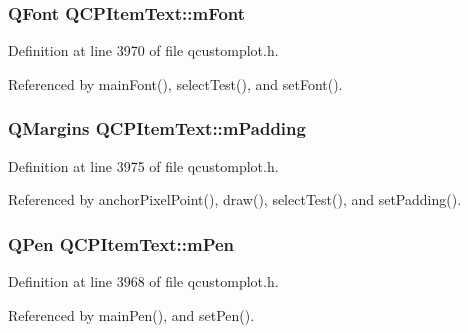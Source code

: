 \subsubsection[{m\+Font}]{\setlength{\rightskip}{0pt plus 5cm}Q\+Font Q\+C\+P\+Item\+Text\+::m\+Font\hspace{0.3cm}{\ttfamily [protected]}}\label{class_q_c_p_item_text_a1dc87fe2a824820d549ffd7e644eef8d}


Definition at line 3970 of file qcustomplot.\+h.



Referenced by main\+Font(), select\+Test(), and set\+Font().

\hypertarget{class_q_c_p_item_text_ae7b3ef0ce6046efd4b346d28f2e1fb67}{}
\subsubsection[{m\+Padding}]{\setlength{\rightskip}{0pt plus 5cm}Q\+Margins Q\+C\+P\+Item\+Text\+::m\+Padding\hspace{0.3cm}{\ttfamily [protected]}}\label{class_q_c_p_item_text_ae7b3ef0ce6046efd4b346d28f2e1fb67}


Definition at line 3975 of file qcustomplot.\+h.



Referenced by anchor\+Pixel\+Point(), draw(), select\+Test(), and set\+Padding().

\hypertarget{class_q_c_p_item_text_aa02388705dbbff1bf7b8aa872b5f579c}{}
\subsubsection[{m\+Pen}]{\setlength{\rightskip}{0pt plus 5cm}Q\+Pen Q\+C\+P\+Item\+Text\+::m\+Pen\hspace{0.3cm}{\ttfamily [protected]}}\label{class_q_c_p_item_text_aa02388705dbbff1bf7b8aa872b5f579c}


Definition at line 3968 of file qcustomplot.\+h.



Referenced by main\+Pen(), and set\+Pen().

\hypertarget{class_q_c_p_item_text_a6c27f7dc1a962a04b32430cf99f04654}{}
